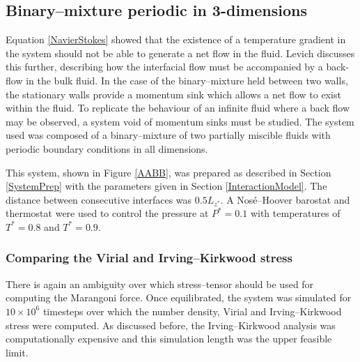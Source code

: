 \subsection{Binary--mixture periodic in 3-dimensions}
Equation \ref{NavierStokes} showed that the existence of a temperature gradient in the system should not be able to generate a net flow in the fluid. 
Levich discusses this further, describing how the interfacial flow must be accompanied by a back-flow in the bulk fluid.\cite{Levich}
In the case of the binary--mixture held between two walls, the stationary walls provide a momentum sink which allows a net flow to exist within the fluid.
To replicate the behaviour of an infinite fluid where a back flow may be observed, a system void of momentum sinks must be studied.
The system used was composed of a binary--mixture of two partially miscible fluids with periodic boundary conditions in all dimensions.

This system, shown in Figure \ref{AABB}, was prepared as described in Section \ref{SystemPrep} with the parameters given in Section \ref{InteractionModel}.
The distance between consecutive interfaces was $0.5 L_{z^{*}}$.
A Nos\'{e}--Hoover barostat and thermostat were used to control the pressure at $P^{*} = 0.1$ with temperatures of $T^{*}=0.8$ and $T^{*}=0.9$.

\subsubsection{Comparing the Virial and Irving--Kirkwood stress}
There is again an ambiguity over which stress--tensor should be used for computing the Marangoni force.
Once equilibrated, the system was simulated for $10 \times 10^{6}$ timesteps over which the number density, Virial and Irving--Kirkwood stress were computed.
As discussed before, the Irving--Kirkwood analysis was computationally expensive and this simulation length was the upper feasible limit.
\FloatBarrier

